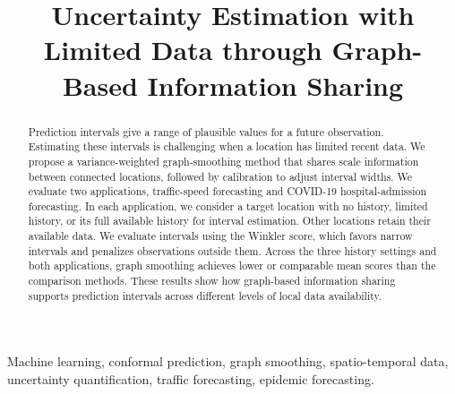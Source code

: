 \documentclass[conference]{IEEEtran}
\begin{document}
\title{Uncertainty Estimation with Limited Data through Graph-Based Information Sharing}

\author{
}

\maketitle

\begin{abstract}
Prediction intervals give a range of plausible values for a future observation. Estimating these intervals is challenging when a location has limited recent data. We propose a variance-weighted graph-smoothing method that shares scale information between connected locations, followed by calibration to adjust interval widths. We evaluate two applications, traffic-speed forecasting and COVID-19 hospital-admission forecasting. In each application, we consider a target location with no history, limited history, or its full available history for interval estimation. Other locations retain their available data. We evaluate intervals using the Winkler score, which favors narrow intervals and penalizes observations outside them. Across the three history settings and both applications, graph smoothing achieves lower or comparable mean scores than the comparison methods. These results show how graph-based information sharing supports prediction intervals across different levels of local data availability.
\end{abstract}

\begin{IEEEkeywords}
Machine learning, conformal prediction, graph smoothing, spatio-temporal data, uncertainty quantification, traffic forecasting, epidemic forecasting.
\end{IEEEkeywords}
\end{document}
